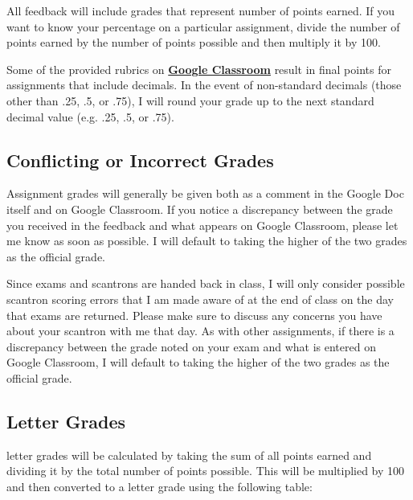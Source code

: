 \documentclass[]{book}
\begin{document}
All feedback will include grades that represent number of points earned. If you want to know your percentage on a particular assignment, divide the number of points earned by the number of points possible and then multiply it by 100.

Some of the provided rubrics on \textbf{\href{https://classroom.google.com}{Google Classroom}} result in final points for assignments that include decimals. In the event of non-standard decimals (those other than .25, .5, or .75), I will round your grade up to the next standard decimal value (e.g. .25, .5, or .75).

\hypertarget{conflicting-or-incorrect-grades}{%
\subsection{Conflicting or Incorrect Grades}\label{conflicting-or-incorrect-grades}}

Assignment grades will generally be given both as a comment in the Google Doc itself and on Google Classroom. If you notice a discrepancy between the grade you received in the feedback and what appears on Google Classroom, please let me know as soon as possible. I will default to taking the higher of the two grades as the official grade.

Since exams and scantrons are handed back in class, I will only consider possible scantron scoring errors that I am made aware of at the end of class on the day that exams are returned. Please make sure to discuss any concerns you have about your scantron with me that day. As with other assignments, if there is a discrepancy between the grade noted on your exam and what is entered on Google Classroom, I will default to taking the higher of the two grades as the official grade.

\hypertarget{letter-grades}{%
\subsection{Letter Grades}\label{letter-grades}}

letter grades will be calculated by taking the sum of all points earned and dividing it by the total number of points possible. This will be multiplied by 100 and then converted to a letter grade using the following table:
\end{document}
